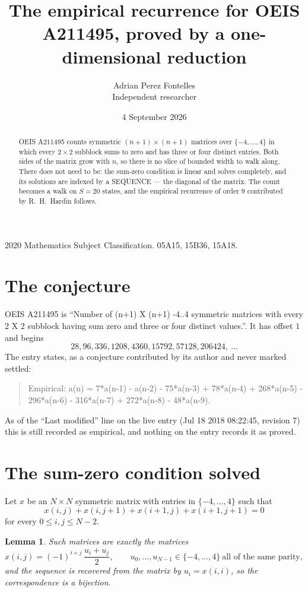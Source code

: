 \documentclass[11pt,a4paper]{article}
\title{The empirical recurrence for OEIS A211495, proved by a one-dimensional reduction}
\author{Adrian Perez Fontelles\\ \small Independent researcher}
\date{4 September 2026}
\theoremstyle{plain}
\newtheorem{lemma}[theorem]{Lemma}
\theoremstyle{definition}
\begin{document}
\maketitle

\begin{abstract}
OEIS A211495 counts symmetric $(n+1)\times(n+1)$ matrices over
$\{-4,\dots,4\}$ in which every $2\times2$ subblock sums to zero and has three or four distinct
entries. Both sides of the matrix grow with $n$, so there is no slice of bounded width to walk
along. There does not need to be: the sum-zero condition is linear and solves completely, and
its solutions are indexed by a SEQUENCE --- the diagonal of the matrix. The count becomes a walk
on $S=20$ states, and the empirical recurrence of order $9$ contributed by R.~H.~Hardin
follows.
\end{abstract}

\noindent\small 2020 Mathematics Subject Classification. 05A15, 15B36, 15A18.\normalsize

\section{The conjecture}

OEIS A211495 is ``Number of (n+1) X (n+1) -4..4 symmetric matrices with every 2 X 2 subblock having sum zero and three or four distinct values.''. It has offset $1$ and begins
\[
28, 96, 336, 1208, 4360, 15792, 57128, 206424,\ \dots
\]
The entry states, as a conjecture contributed by its author and never marked settled:
\begin{quote}
Empirical: a(n) = 7*a(n-1) - a(n-2) - 75*a(n-3) + 78*a(n-4) + 268*a(n-5) - 296*a(n-6) - 316*a(n-7) + 272*a(n-8) - 48*a(n-9).
\end{quote}
As of the ``Last modified'' line on the live entry (Jul 18 2018 08:22:45, revision 7) this is still
recorded as empirical, and nothing on the entry records it as proved.

\section{The sum-zero condition solved}

Let $x$ be an $N\times N$ symmetric matrix with entries in $\{-4,\dots,4\}$ such that
\[
x(i,j)+x(i,j{+}1)+x(i{+}1,j)+x(i{+}1,j{+}1)=0
\]
for every $0\le i,j\le N-2$.

\begin{lemma}\label{lem:solve}
Such matrices are exactly the matrices
\[
x(i,j)=(-1)^{i+j}\,\frac{u_i+u_j}{2},
\qquad u_0,\dots,u_{N-1}\in\{-4,\dots,4\}\ \text{all of the same parity},
\]
and the sequence is recovered from the matrix by $u_i=x(i,i)$, so the correspondence is a
bijection.
\end{lemma}
\end{document}
